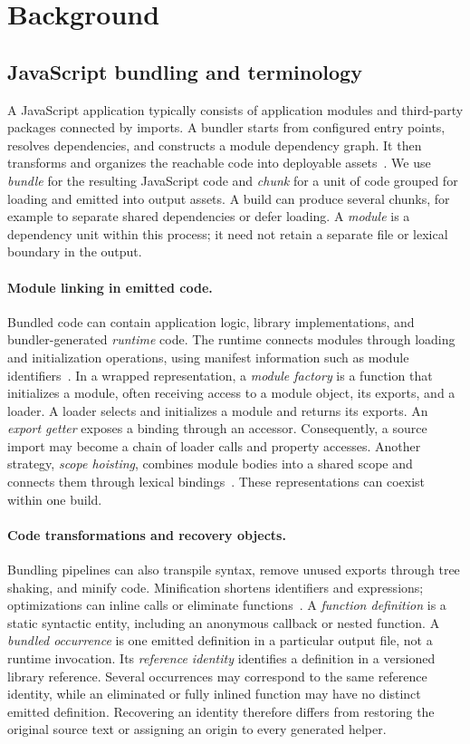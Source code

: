 \section{Background}
\label{sec:background}

\subsection{JavaScript bundling and terminology}
A JavaScript application typically consists of application modules and third-party packages connected by imports. A bundler starts from configured entry points, resolves dependencies, and constructs a module dependency graph. It then transforms and organizes the reachable code into deployable assets~\cite{webpackConcepts}. We use \emph{bundle} for the resulting JavaScript code and \emph{chunk} for a unit of code grouped for loading and emitted into output assets. A build can produce several chunks, for example to separate shared dependencies or defer loading. A \emph{module} is a dependency unit within this process; it need not retain a separate file or lexical boundary in the output.

\paragraph{Module linking in emitted code.}
Bundled code can contain application logic, library implementations, and bundler-generated \emph{runtime} code. The runtime connects modules through loading and initialization operations, using manifest information such as module identifiers~\cite{webpackManifest}. In a wrapped representation, a \emph{module factory} is a function that initializes a module, often receiving access to a module object, its exports, and a loader. A loader selects and initializes a module and returns its exports. An \emph{export getter} exposes a binding through an accessor. Consequently, a source import may become a chain of loader calls and property accesses. Another strategy, \emph{scope hoisting}, combines module bodies into a shared scope and connects them through lexical bindings~\cite{webpackConcatenation}. These representations can coexist within one build.

\paragraph{Code transformations and recovery objects.}
Bundling pipelines can also transpile syntax, remove unused exports through tree shaking, and minify code. Minification shortens identifiers and expressions; optimizations can inline calls or eliminate functions~\cite{webpackTreeShaking,terserOptions}. A \emph{function definition} is a static syntactic entity, including an anonymous callback or nested function. A \emph{bundled occurrence} is one emitted definition in a particular output file, not a runtime invocation. Its \emph{reference identity} identifies a definition in a versioned library reference. Several occurrences may correspond to the same reference identity, while an eliminated or fully inlined function may have no distinct emitted definition. Recovering an identity therefore differs from restoring the original source text or assigning an origin to every generated helper.

